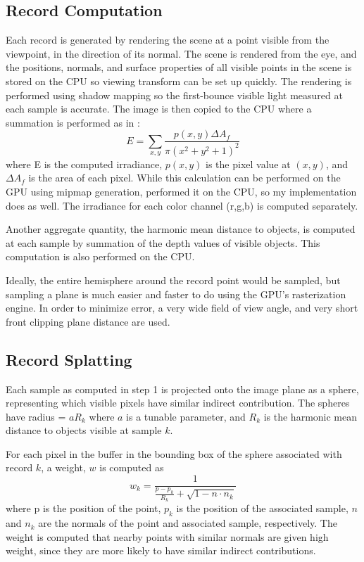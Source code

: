 \documentclass[10pt,twopage]{acmsiggraph}
\begin{document}
\subsection{Record Computation}
Each record is generated by rendering the scene at a point visible from the viewpoint, in the direction of its normal.  The scene is rendered from the eye, and the positions, normals, and surface properties of all visible points in the scene is stored on the CPU so viewing transform can be set up quickly.  The rendering is performed using shadow mapping so the first-bounce visible light measured at each sample is accurate.  The image is then copied to the CPU where a summation is performed as in \cite{larsen2004simulating}: 
$$
E = \sum_{x,y}\frac{p(x,y)\Delta A_f}{\pi(x^2 + y^2 +1)^2}
$$
where E is the computed irradiance, $p(x,y)$ is the pixel value at $(x,y)$,  and $\Delta A_f$ is the area of each pixel.  While this calculation can be performed on the GPU using mipmap generation, \cite{mainpaper} performed it on the CPU, so my implementation does as well.  The irradiance for each color channel (r,g,b) is computed separately.

Another aggregate quantity, the harmonic mean distance to objects, is computed at each sample by summation of the depth values of visible objects.  This computation is also performed on the CPU.

Ideally, the entire hemisphere around the record point would be sampled, but sampling a plane is much easier and faster to do using the GPU's rasterization engine.  In order to minimize error, a very wide field of view angle, and very short front clipping plane distance are used.    

\subsection{Record Splatting}
Each sample as computed in step 1 is projected onto the image plane as a sphere, representing which visible pixels have similar indirect contribution.  The spheres have radius = $aR_k$ where $a$ is a tunable parameter, and $R_k$ is the harmonic mean distance to objects visible at sample $k$.

For each pixel in the buffer in the bounding box of the sphere associated with record $k$, a weight, $w$ is computed as
$$
w_k = \frac{1}{\frac{p - p_k}{R_k} + \sqrt{1 - n \cdot n_k}}
$$
where p is the position of the point, $p_k$ is the position of the associated sample, $n$ and $n_k$ are the normals of the point and associated sample, respectively.  The weight is computed that nearby points with similar normals are given high weight, since they are more likely to have similar indirect contributions.
\end{document}
